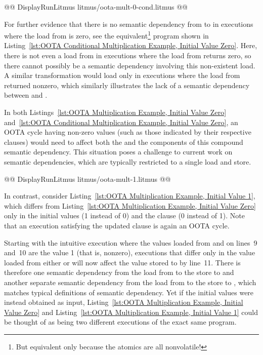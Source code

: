\documentclass[10]{article}
\begin{document}
\begin{listing}[tbp]
@@ DisplayRunLitmus litmus/oota-mult-0-cond.litmus @@
\caption{OOTA Conditional Multiplication Example, Initial Value Zero}
\label{lst:OOTA Conditional Multiplication Example, Initial Value Zero}
\end{listing}

For further evidence that there is no semantic dependency from 
to  in executions where the load from  is zero, see the
equivalent\footnote{
	But equivalent only because the atomics are all nonvolatile!}
program shown in
Listing~\ref{lst:OOTA Conditional Multiplication Example, Initial Value Zero}.
Here, there is not even a load from  in executions where the
load from  returns zero, so there cannot possibly be a semantic
dependency involving this non-existent load.
A similar transformation would load  only in executions where the
load from  returned nonzero, which similarly illustrates the lack
of a semantic dependency between  and .

In both
Listings~\ref{lst:OOTA Multiplication Example, Initial Value Zero}
and~\ref{lst:OOTA Conditional Multiplication Example, Initial Value Zero},
an OOTA cycle having non-zero values (such as those indicated by their
respective  clauses) would need to affect both the 
and the  components of this compound semantic dependency.
This situation poses a challenge to current work on semantic dependencies,
which are typically restricted to a single load and store.

\begin{listing}[tbp]
@@ DisplayRunLitmus litmus/oota-mult-1.litmus @@
\caption{OOTA Multiplication Example, Initial Value 1}
\label{lst:OOTA Multiplication Example, Initial Value 1}
\end{listing}

In contrast, consider
Listing~\ref{lst:OOTA Multiplication Example, Initial Value 1},
which differs from
Listing~\ref{lst:OOTA Multiplication Example, Initial Value Zero}
only in the initial values (1 instead of 0) and the 
clause (0 instead of 1).
Note that an execution satisfying the updated  clause is again
an OOTA cycle.

Starting with the intuitive execution where the values loaded from 
and  on lines~9 and~10 are the value 1 (that is, nonzero), executions
that differ only in the value loaded from either  or  will
now affect the value stored to  by line~11.
There is therefore one semantic dependency from the load from 
to the store to  and another separate semantic dependency from
the load from  to the store to , which matches typical
definitions of semantic dependency.
Yet if the initial values were instead obtained as input,
Listing~\ref{lst:OOTA Multiplication Example, Initial Value Zero}
and
Listing~\ref{lst:OOTA Multiplication Example, Initial Value 1}
could be thought of as being two different executions of the exact same
program.
\end{document}
